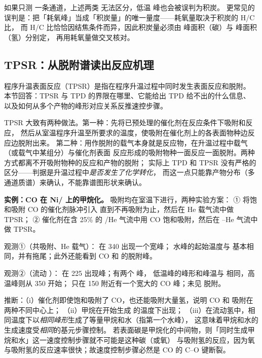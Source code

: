 \begin{pitfall}
如果只测  一条通道，上述两类  无法区分，低温  峰也会被误判为积炭。
更常见的误判是：把「耗氧峰」当成「积炭量」的唯一量度——耗氧量取决于积炭的 H/C 比，
而 H/C 比恰恰因结焦条件而异，因此积炭量必须由  峰面积（碳）与  峰面积（氢）分别定，
再用耗氧量做交叉核对。
\end{pitfall}

\subsection{TPSR：从脱附谱读出反应机理}
\label{sec:ch05b-tpsr}

\begin{probout}
程序升温表面反应（TPSR）是指在程序升温过程中同时发生表面反应和脱附。
本节回答：TPSR 与 TPD 的界限在哪里、它能给出 TPD 给不出的什么信息、
以及如何从多个产物的峰形对应关系反推速控步骤。
\end{probout}

\begin{principle}
TPSR 大致有两种做法。第一种：先将已预处理的催化剂在反应条件下吸附和反应，
然后从室温程序升温至所要求的温度，使吸附在催化剂上的各表面物种边反应边脱附出来。
第二种：用作脱附的载气本身就是反应物，在升温过程中载气（或载气中某组分）与催化剂表面
反应形成的吸附物种一面反应一面脱附。两种方式都离不开吸附物种的反应和产物的脱附；
实际上 TPD 和 TPSR 没有严格的区分——判据是升温过程中\emph{是否发生了化学转化}，
而这一点只能靠产物分布（多通道质谱）来确认，不能靠谱图形状来确认。
\end{principle}

\begin{dataflow}
\textbf{实例：CO 在 Ni/ 上的甲烷化。} 吸附均在室温下进行，两种实验方案：
① 将饱和吸附 CO 的催化剂脉冲引入  直到不再吸附为止，然后在 He 载气流中做 TPSR；
② 催化剂在含 25\%  的 /He 气流中用 CO 饱和吸附，然后在 --He 气流中做 TPSR。

观测①（共吸附、He 载气）： 在 \qty{340}{\degC} 出现一个宽峰；
水峰的起始温度与  基本相同，并有拖尾；此外还能看到 CO 和  的脱附峰。

观测②（流动 ）： 在 \qty{225}{\degC} 出现峰；有两个  峰，
低温峰的峰形和峰温与  相同，高温峰则从 \qty{350}{\degC} 开始；
只在 \qty{150}{\degC} 附近有一个宽大的 CO 峰；未见  脱附。

推断：（i）催化剂即使饱和吸附了 CO，也还能吸附大量氢，说明 CO 和  吸附在两种不同中心上；
（ii）甲烷在开始生成  的温度下出现；
（iii）在流动氢中，相同温度下以\emph{相同峰形}生成了等量甲烷和水（指第一个水峰），
这意味着甲烷和水的生成速度受\emph{相同}的基元步骤控制。
若表面碳是甲烷化的中间物，则「同时生成甲烷和水」这一速度控制步骤就不可能是这种碳（或氧）
与吸附氢的反应，因为氧与吸附氢的反应速率很快；故速度控制步骤必然是 CO 的 C--O 键断裂。
\end{dataflow}

